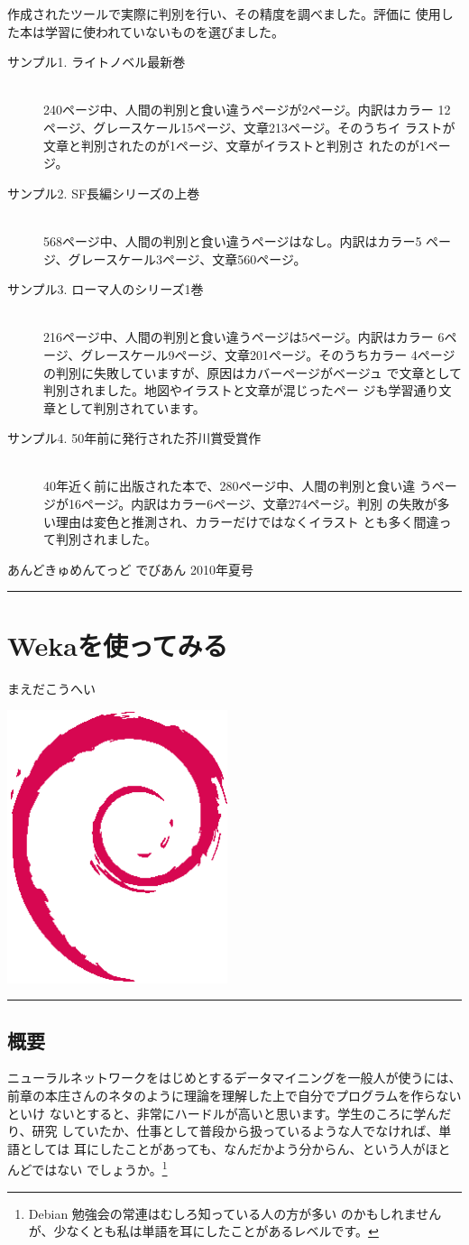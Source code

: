 \documentclass[mingoth,a4paper]{jsarticle}
\renewcommand{\dancersection}[2]{%
\newpage
あんどきゅめんてっど でびあん 2010年夏号
%
\vspace{0.1mm}\\
{\color{dancerlightblue}\rule{\hsize}{2mm}}

%
%
\begin{minipage}[t]{0.6\hsize}
\color{dancerdarkblue}
\vspace{1cm}
\section{#1}
\hfill{}#2\\
\end{minipage}
\begin{minipage}[t]{0.4\hsize}
\vspace{-2cm}
\hfill{}\includegraphics[height=8cm]{image200502/openlogo-nd.eps}\\
\vspace{-5cm}
\end{minipage}
%
%
{\color{dancerdarkblue}\rule{0.74\hsize}{2mm}}
%
\vspace{2cm}
}
\begin{document}
作成されたツールで実際に判別を行い、その精度を調べました。評価に
使用した本は学習に使われていないものを選びました。

\begin{description}
 \item[サンプル1. ライトノベル最新巻] \mbox{}\\
    240ページ中、人間の判別と食い違うページが2ページ。内訳はカラー
    12ページ、グレースケール15ページ、文章213ページ。そのうちイ
    ラストが文章と判別されたのが1ページ、文章がイラストと判別さ
    れたのが1ページ。
 \item[サンプル2. SF長編シリーズの上巻] \mbox{}\\
    568ページ中、人間の判別と食い違うページはなし。内訳はカラー5
    ページ、グレースケール3ページ、文章560ページ。
 \item[サンプル3. ローマ人のシリーズ1巻] \mbox{}\\
    216ページ中、人間の判別と食い違うページは5ページ。内訳はカラー
    6ページ、グレースケール9ページ、文章201ページ。そのうちカラー
    4ページの判別に失敗していますが、原因はカバーページがベージュ
    で文章として判別されました。地図やイラストと文章が混じったペー
    ジも学習通り文章として判別されています。
 \item[サンプル4. 50年前に発行された芥川賞受賞作] \mbox{}\\
    40年近く前に出版された本で、280ページ中、人間の判別と食い違
    うページが16ページ。内訳はカラー6ページ、文章274ページ。判別
    の失敗が多い理由は変色と推測され、カラーだけではなくイラスト
    とも多く間違って判別されました。
\end{description}

\dancersection{Wekaを使ってみる}{まえだこうへい}
\subsection{概要}

ニューラルネットワークをはじめとするデータマイニングを一般人が使うには、
前章の本庄さんのネタのように理論を理解した上で自分でプログラムを作らないといけ
ないとすると、非常にハードルが高いと思います。学生のころに学んだり、研究
していたか、仕事として普段から扱っているような人でなければ、単語としては
耳にしたことがあっても、なんだかよう分からん、という人がほとんどではない
でしょうか。\footnote{Debian 勉強会の常連はむしろ知っている人の方が多い
のかもしれませんが、少なくとも私は単語を耳にしたことがあるレベルです。}
\end{document}
